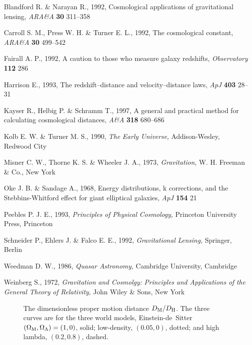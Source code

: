 \begin{references}
\item
Blandford R. \& Narayan R., 1992, Cosmological applications of
gravitational lensing, {\em ARA\&A\/} {\bf 30} 311--358
\item
Carroll S. M., Press W. H. \& Turner E. L., 1992, The cosmological
constant, {\em ARA\&A\/} {\bf 30} 499--542
\item
Fairall A. P., 1992, A caution to those who measure galaxy redshifts,
{\em Observatory\/} {\bf 112} 286
\item
Harrison E., 1993, The redshift--distance and velocity--distance laws,
{\em ApJ\/} {\bf 403} 28--31
\item
Kayser R., Helbig P. \& Schramm T., 1997, A general and practical
method for calculating cosmological distances, {\em A\&A\/} {\bf 318}
680--686
\item
Kolb E. W. \& Turner M. S., 1990, {\em The Early Universe,\/}
Addison-Wesley, Redwood City
\item
Misner C. W., Thorne K. S. \& Wheeler J. A., 1973, {\em Gravitation,}
W. H. Freeman \& Co., New York
\item
Oke J. B. \& Sandage A., 1968, Energy distributions, k corrections,
and the Stebbins-Whitford effect for giant elliptical galaxies, {\em
ApJ\/} {\bf 154} 21
\item
Peebles P. J. E., 1993, {\em Principles of Physical Cosmology,\/}
Princeton University Press, Princeton
\item
Schneider P., Ehlers J. \& Falco E. E., 1992, {\em Gravitational
Lensing,\/} Springer, Berlin
\item
Weedman D. W., 1986, {\em Quasar Astronomy,\/} Cambridge University,
Cambridge
\item
Weinberg S., 1972, {\em Gravitation and Cosmolgy: Principles and
Applications of the General Theory of Relativity,\/} John Wiley \&
Sons, New York
\end{references}


\clearpage
\begin{figure}
\caption[The dimensionless proper motion distance $D_{\rm M}/D_{\rm
H}$.]{ The dimensionless proper motion distance $D_{\rm M}/D_{\rm H}$.
The three curves are for the three world models, Einstein-de~Sitter
$(\Omega_{\rm M},\Omega_{\Lambda})=(1,0)$, solid; low-density,
$(0.05,0)$, dotted; and high lambda, $(0.2,0.8)$, dashed.}
\label{propmotdis}
\end{figure}

